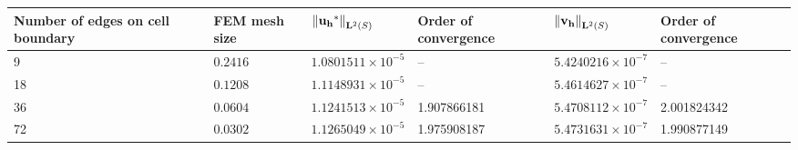 \documentclass[pdflatex,sn-mathphys-num]{sn-jnl}
\newtheorem*{lemma star}{Lemma}
\begin{document}
\begin{table}[h!]
\begin{tabular}{m{1.5cm}m{1cm}|m{2.5cm}m{1.5cm}||m{2.5cm}m{1.5cm}}
\textbf{Number of edges on cell boundary} & \textbf{FEM mesh size} & \textbf{$\left\Vert \mathbf{u_h}{^*}\right\Vert _{{\bf L}^{2}(S)}$} & \textbf{Order of convergence} & \textbf{$\left\Vert \mathbf{v_h}%
\right\Vert _{{\bf L}^{2}(S)}$} & \textbf{Order of convergence} \\
\hline
9  & $0.2416$ & $1.0801511 \times 10^{-5}$ & --              & $5.4240216 \times 10^{-7}$ & --              \\
18 & $0.1208$ & $1.1148931 \times 10^{-5}$ & --              & $5.4614627 \times 10^{-7}$ & --              \\
36 & $0.0604$ & $1.1241513 \times 10^{-5}$ & 1.907866181     & $5.4708112 \times 10^{-7}$ & 2.001824342     \\
72 & $0.0302$ & $1.1265049 \times 10^{-5}$ & 1.975908187     & $5.4731631 \times 10^{-7}$ & 1.990877149     \\
\hline
\hline
\end{tabular}
\end{table}
\end{document}
